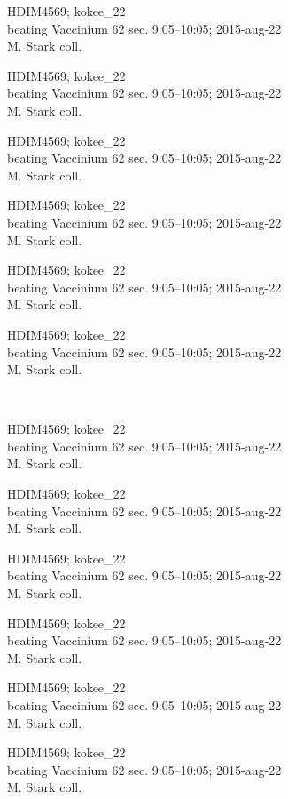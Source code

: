 \documentclass[2pt]{extarticle}
\begin{document}
\noindent
\parbox{0.16\textwidth}{\tiny \raggedright \rule[-0.3\baselineskip]{0pt}{10pt}HDIM4569; kokee\_22\\ beating Vaccinium 62 sec. 9:05--10:05; 2015-aug-22\\ M. Stark coll.}
\parbox{0.16\textwidth}{\tiny \raggedright \rule[-0.3\baselineskip]{0pt}{10pt}HDIM4569; kokee\_22\\ beating Vaccinium 62 sec. 9:05--10:05; 2015-aug-22\\ M. Stark coll.}
\parbox{0.16\textwidth}{\tiny \raggedright \rule[-0.3\baselineskip]{0pt}{10pt}HDIM4569; kokee\_22\\ beating Vaccinium 62 sec. 9:05--10:05; 2015-aug-22\\ M. Stark coll.}
\parbox{0.16\textwidth}{\tiny \raggedright \rule[-0.3\baselineskip]{0pt}{10pt}HDIM4569; kokee\_22\\ beating Vaccinium 62 sec. 9:05--10:05; 2015-aug-22\\ M. Stark coll.}
\parbox{0.16\textwidth}{\tiny \raggedright \rule[-0.3\baselineskip]{0pt}{10pt}HDIM4569; kokee\_22\\ beating Vaccinium 62 sec. 9:05--10:05; 2015-aug-22\\ M. Stark coll.}
\parbox{0.16\textwidth}{\tiny \raggedright \rule[-0.3\baselineskip]{0pt}{10pt}HDIM4569; kokee\_22\\ beating Vaccinium 62 sec. 9:05--10:05; 2015-aug-22\\ M. Stark coll.} \\ 
\vspace{0.001in} 

\noindent
\parbox{0.16\textwidth}{\tiny \raggedright \rule[-0.3\baselineskip]{0pt}{10pt}HDIM4569; kokee\_22\\ beating Vaccinium 62 sec. 9:05--10:05; 2015-aug-22\\ M. Stark coll.}
\parbox{0.16\textwidth}{\tiny \raggedright \rule[-0.3\baselineskip]{0pt}{10pt}HDIM4569; kokee\_22\\ beating Vaccinium 62 sec. 9:05--10:05; 2015-aug-22\\ M. Stark coll.}
\parbox{0.16\textwidth}{\tiny \raggedright \rule[-0.3\baselineskip]{0pt}{10pt}HDIM4569; kokee\_22\\ beating Vaccinium 62 sec. 9:05--10:05; 2015-aug-22\\ M. Stark coll.}
\parbox{0.16\textwidth}{\tiny \raggedright \rule[-0.3\baselineskip]{0pt}{10pt}HDIM4569; kokee\_22\\ beating Vaccinium 62 sec. 9:05--10:05; 2015-aug-22\\ M. Stark coll.}
\parbox{0.16\textwidth}{\tiny \raggedright \rule[-0.3\baselineskip]{0pt}{10pt}HDIM4569; kokee\_22\\ beating Vaccinium 62 sec. 9:05--10:05; 2015-aug-22\\ M. Stark coll.}
\parbox{0.16\textwidth}{\tiny \raggedright \rule[-0.3\baselineskip]{0pt}{10pt}HDIM4569; kokee\_22\\ beating Vaccinium 62 sec. 9:05--10:05; 2015-aug-22\\ M. Stark coll.} \\ 
\vspace{0.001in} 
\end{document}
